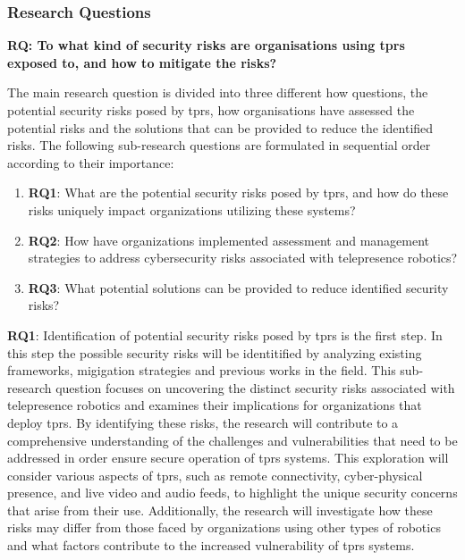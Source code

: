 \subsubsection{Research Questions}

\textbf{RQ: To what kind of security risks are organisations using \ac{tprs} exposed to, and how to mitigate the risks?}


The main research question is divided into three different how questions, the potential security risks posed by \ac{tprs}, how organisations
have assessed the potential risks and the solutions that can be provided to reduce the identified risks. The following sub-research
questions are formulated
in sequential order according to their importance:

\begin{enumerate}
  \item\textbf{RQ1}: What are the potential security risks posed by \ac{tprs}, and how do these risks uniquely impact organizations utilizing these systems?
  \item\textbf{RQ2}: How have organizations implemented assessment and management strategies to address cybersecurity risks associated with telepresence robotics?
  \item\textbf{RQ3}: What potential solutions can be provided to reduce identified security risks?
\end{enumerate}

\textbf{RQ1}: Identification of potential security risks posed by \ac{tprs} is the first step. In this step the possible security risks will be identitified by analyzing existing frameworks, migigation strategies and previous works in the field. This sub-research question focuses on uncovering the distinct security risks associated with telepresence robotics and examines their implications for organizations that deploy \ac{tprs}.
  By identifying these risks, the research will contribute to a comprehensive understanding of the challenges and vulnerabilities that need to be addressed in order ensure secure operation of \ac{tprs} systems.
  This exploration will consider various aspects of \ac{tprs}, such as remote connectivity, cyber-physical presence, and live video and audio feeds, to highlight the unique security concerns that arise from their use.
  Additionally, the research will investigate how these risks may differ from those faced by organizations using other types of robotics and what factors contribute to the increased vulnerability of \ac{tprs} systems.

